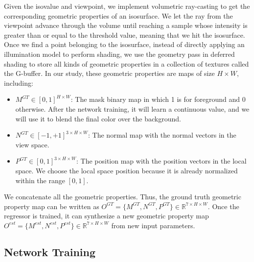 \documentclass[journal]{vgtc}                %
\begin{document}
Given the isovalue and viewpoint, we implement volumetric ray-casting to get the corresponding geometric properties of an isosurface. We let the ray from the viewpoint advance through the volume until reaching a sample whose intensity is greater than or equal to the threshold value, meaning that we hit the isosurface. Once we find a point belonging to the isosurface, instead of directly applying an illumination model to perform shading, we use the geometry pass in deferred shading \cite{deering1988triangle} to store all kinds of geometric properties in a collection of textures called the G-buffer. In our study, these geometric properties are maps of size $ H \times W $, including:

\begin{itemize}
\item $M^{GT} \in [0, 1] ^ {H \times W}$: The mask binary map in which 1 is for foreground and 0 otherwise. After the network training, it will learn a continuous value, and we will use it to blend the final color over the background.  

\item $N^{GT} \in [-1, +1] ^ {3 \times H \times W}$: The normal map with the normal vectors in the view space.

\item $P^{GT} \in [0, 1] ^ {3 \times H \times W}$: The position map with the position vectors in the local space. We choose the local space position because it is already normalized within the range $[0, 1]$.

\end{itemize}

We concatenate all the geometric properties. Thus, the ground truth geometric property map can be written as $O^{GT} = \{M^{GT}, N^{GT}, P^{GT}\} \in \mathbb{R}^{7 \times H \times W}$. Once the regressor is trained, it can synthesize a new geometric property map $O^{est} = \{M^{est}, N^{est}, P^{est}\} \in \mathbb{R}^{7 \times H \times W}$ from new input parameters. 

\subsection{Network Training}
\end{document}
